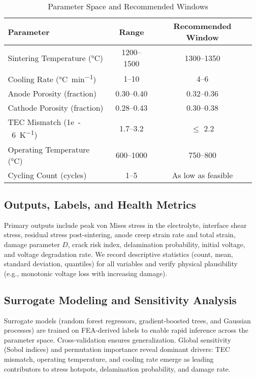 \documentclass[conference]{IEEEtran}
\begin{document}
\begin{table}[t]
  \centering
  \caption{Parameter Space and Recommended Windows}
  \label{tab:doe}
  \begin{tabular}{lcc}
    \toprule
    Parameter & Range & Recommended Window \\
    \midrule
    Sintering Temperature (\si{\celsius}) & 1200--1500 & 1300--1350 \\
    Cooling Rate (\si{\celsius\per\minute}) & 1--10 & 4--6 \\
    Anode Porosity (fraction) & 0.30--0.40 & 0.32--0.36 \\
    Cathode Porosity (fraction) & 0.28--0.43 & 0.30--0.38 \\
    TEC Mismatch (\si{1e-6\per\kelvin}) & 1.7--3.2 & $\leq$ 2.2 \\
    Operating Temperature (\si{\celsius}) & 600--1000 & 750--800 \\
    Cycling Count (cycles) & 1--5 & As low as feasible \\
    \bottomrule
  \end{tabular}
  \vspace{-0.5em}
\end{table}

\subsection{Outputs, Labels, and Health Metrics}
Primary outputs include peak von Mises stress in the electrolyte, interface shear stress, residual stress post-sintering, anode creep strain rate and total strain, damage parameter $D$, crack risk index, delamination probability, initial voltage, and voltage degradation rate. We record descriptive statistics (count, mean, standard deviation, quantiles) for all variables and verify physical plausibility (e.g., monotonic voltage loss with increasing damage).

\subsection{Surrogate Modeling and Sensitivity Analysis}
Surrogate models (random forest regressors, gradient-boosted trees, and Gaussian processes) are trained on FEA-derived labels to enable rapid inference across the parameter space. Cross-validation ensures generalization. Global sensitivity (Sobol indices) and permutation importance reveal dominant drivers: TEC mismatch, operating temperature, and cooling rate emerge as leading contributors to stress hotspots, delamination probability, and damage rate.
\end{document}
